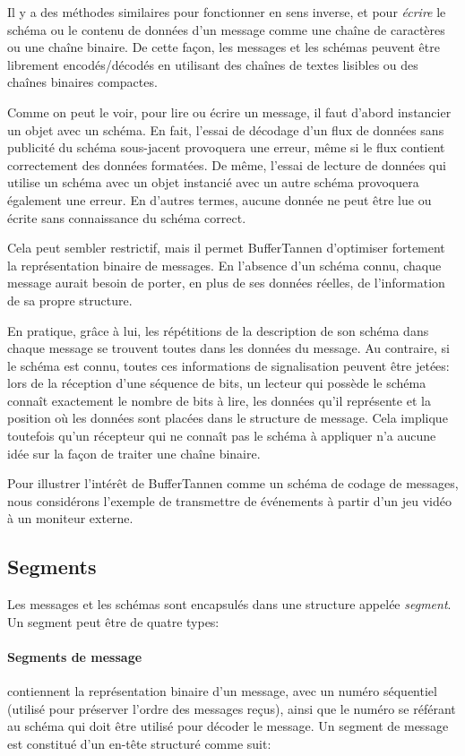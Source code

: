 Il y a des méthodes similaires pour fonctionner en sens inverse, et pour \emph {écrire} le schéma ou le contenu de données d'un message comme une chaîne de caractères ou une chaîne binaire. De cette façon, les messages et les schémas peuvent être librement encodés/décodés en utilisant des chaînes de textes lisibles ou des chaînes binaires compactes.

Comme on peut le voir, pour lire ou écrire un message, il faut d'abord instancier un objet avec un schéma. En fait, l'essai de décodage d'un flux de données sans publicité du schéma sous-jacent provoquera une erreur, même si le flux contient correctement des données formatées. De même, l'essai de lecture de données qui utilise un  schéma avec un objet instancié avec un autre schéma provoquera également une erreur. En d'autres termes, aucune donnée ne peut être lue ou écrite sans connaissance du schéma correct.

Cela peut sembler restrictif, mais il permet BufferTannen d'optimiser fortement la représentation binaire de messages. En l'absence d'un schéma connu, chaque message aurait besoin de porter, en plus de ses données réelles, de l'information de sa propre structure.

En pratique, grâce à lui, les répétitions de la description de son schéma dans chaque message se trouvent toutes dans les données du message. Au contraire, si le schéma est connu, toutes ces informations de signalisation peuvent être jetées: lors de la réception d'une séquence de bits, un lecteur qui possède le schéma connaît exactement le nombre de bits à lire, les données qu'il représente et la position où les données sont placées dans le structure de message. Cela implique toutefois qu'un récepteur qui ne connaît pas le schéma à appliquer n'a aucune idée sur la façon de traiter une chaîne binaire.

Pour illustrer l'intérêt de BufferTannen comme un schéma de codage de messages, nous considérons l'exemple de transmettre de événements à partir d'un jeu vidéo à un moniteur externe.

\subsection{Segments}
\setcounter{paragraph}{0}

Les messages et les schémas sont encapsulés dans une structure appelée \emph{segment}. Un segment peut être de quatre types:

\paragraph{Segments de message} contiennent la représentation binaire d'un message, avec un numéro séquentiel (utilisé pour préserver l'ordre des messages reçus), ainsi que le numéro se référant au schéma qui doit être utilisé pour décoder le message. Un segment de message est constitué d'un en-tête structuré comme suit:

